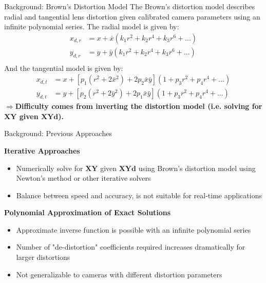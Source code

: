 \documentclass[final,16pt]{beamer}
\newlength{\colwidth}
\begin{document}
\begin{frame}[t]
\begin{columns}[t]
\begin{column}{\colwidth}
      \begin{block}{Background: Brown's Distortion Model}
        The Brown's distortion model describes radial and tangential lens distortion given calibrated camera parameters using an infinite polynomial series. The radial model is given by:
        \begin{align*}
          x_{d,r} & = x + \bar{x} \left( k_1 r^2 + k_2 r^4 + k_3 r^6 + ... \right) \\
          y_{d,r} & = y + \bar{y} \left( k_1 r^2 + k_2 r^4 + k_3 r^6 + ... \right) \\
        \end{align*}
        And the tangential model is given by:
        \begin{align*}
          x_{d,t} & = x + \left[p_1 (r^2 + 2 \bar{x}^2) + 2 p_2 \bar{x} \bar{y}\right] \left(1 + p_3 r^2 + p_4 r^4 + ...\right) \\
          y_{d,t} & = y + \left[p_2 (r^2 + 2 \bar{y}^2) + 2 p_1 \bar{x} \bar{y}\right]\left(1 + p_3 r^2 + p_4 r^4 + ...\right)
        \end{align*}
        $\Rightarrow$\textbf{Difficulty comes from inverting the distortion model (i.e. solving for $\mathbf{XY}$ given $\mathbf{XYd}$).}
      \end{block}

      \begin{block}{Background: Previous Approaches}

        \textbf{Iterative Approaches} \cite{villiers_centi-pixel_2008}
        \begin{itemize}
          \item Numerically solve for $\mathbf{XY}$ given $\mathbf{XYd}$ using Brown's distortion model using Newton's method or other iterative solvers
          \item Balance between speed and accuracy, is not suitable for real-time applications
        \end{itemize}

        \textbf{Polynomial Approximation of Exact Solutions} \cite{drap_exact_2016}
        \begin{itemize}
          \item Approximate inverse function is possible with an infinite polynomial series
          \item Number of "de-distortion" coefficients required increases dramatically for larger distortions
          \item Not generalizable to cameras with different distortion parameters
        \end{itemize}


\end{block}
\end{column}
\end{columns}
\end{frame}
\end{document}
